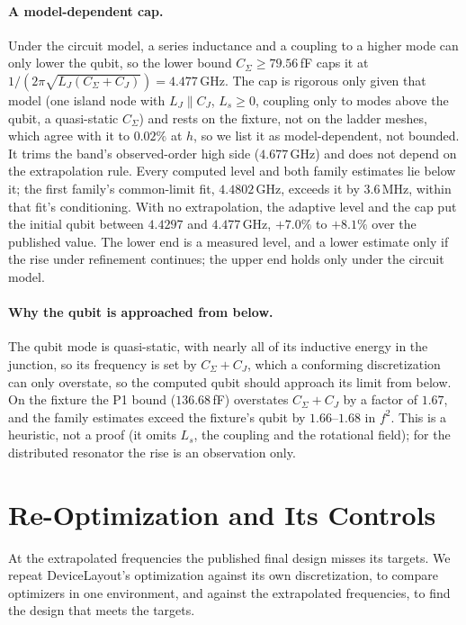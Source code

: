 \documentclass{anvil-paper}
\begin{document}
\paragraph{A model-dependent cap.}
Under the circuit model, a series inductance and a coupling to a higher
mode can only lower the qubit, so the lower bound $C_\Sigma \ge
79.56$\,fF caps it at $1/(2\pi\sqrt{L_J(C_\Sigma + C_J)}) = 4.477$\,GHz.
The cap is rigorous only given that model (one island node with $L_J
\parallel C_J$, $L_s \ge 0$, coupling only to modes above the qubit, a
quasi-static $C_\Sigma$) and rests on the fixture, not on the ladder meshes,
which agree with it to $0.02\%$ at $h$, so we list it as model-dependent,
not bounded. It trims the band's observed-order high side ($4.677$\,GHz)
and does not depend on the extrapolation rule. Every computed level and both family
estimates lie below it; the first family's common-limit fit, $4.4802$\,GHz,
exceeds it by $3.6$\,MHz, within that fit's conditioning. With no
extrapolation, the adaptive level and the cap put the initial qubit between
$4.4297$ and $4.477$\,GHz, $+7.0\%$ to $+8.1\%$ over the published value.
The lower end is a measured level, and a lower estimate only if the rise
under refinement continues; the upper end holds only under the circuit
model.

\paragraph{Why the qubit is approached from below.}
The qubit mode is quasi-static, with nearly all of its inductive energy in
the junction, so its frequency is set by $C_\Sigma + C_J$, which a
conforming discretization can only overstate, so the computed qubit should
approach its limit from below. On the fixture the P1 bound ($136.68$\,fF)
overstates $C_\Sigma + C_J$ by a factor of $1.67$, and the family estimates
exceed the fixture's qubit by $1.66$--$1.68$ in $f^2$. This is a heuristic,
not a proof (it omits $L_s$, the coupling and the rotational field); for
the distributed resonator the rise is an observation only.

\section{Re-Optimization and Its Controls}
\label{sec:reopt}

At the extrapolated frequencies the published final design misses its
targets. We repeat DeviceLayout's optimization against its own
discretization, to compare optimizers in one environment, and against the
extrapolated frequencies, to find the design that meets the targets.
\end{document}
